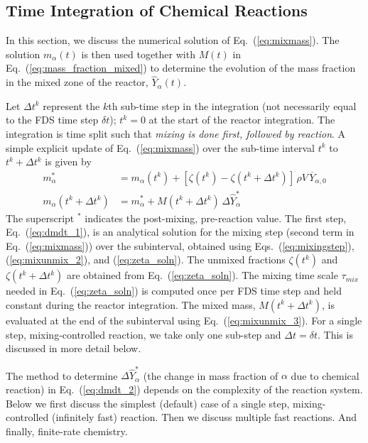 \subsection{Time Integration of Chemical Reactions}
\label{sec:reac_time_integration}

In this section, we discuss the numerical solution of Eq.~(\ref{eq:mixmass}).  The solution $m_\alpha(t)$ is then used together with $M(t)$ in Eq.~(\ref{eq:mass_fraction_mixed}) to determine the evolution of the mass fraction in the mixed zone of the reactor, $\hat{Y}_\alpha(t)$.

Let $\Delta t^k$ represent the $k$th sub-time step in the integration (not necessarily equal to the FDS time step $\delta t$); $t^k=0$ at the start of the reactor integration.  The integration is time split such that \emph{mixing is done first, followed by reaction}. A simple explicit update of Eq.~(\ref{eq:mixmass}) over the sub-time interval $t^k$ to $t^k + \Delta t^k$ is given by
\begin{align}
\label{eq:dmdt_1} m_\alpha^* &= m_{\alpha}(t^k) + [ \zeta(t^k) - \zeta(t^k+\Delta t^k) ] \, \rho V \, \overline{Y}_{\alpha,0}  \\
\label{eq:dmdt_2} m_\alpha(t^k + \Delta t^k) &= m_{\alpha}^* + M(t^k + \Delta t^k) \, \Delta \hat{Y}_\alpha^*
\end{align}
The superscript $^*$ indicates the post-mixing, pre-reaction value.  The first step, Eq.~(\ref{eq:dmdt_1}), is an analytical solution for the mixing step (second term in Eq.~(\ref{eq:mixmass})) over the subinterval, obtained using Eqs.~(\ref{eq:mixingstep}), (\ref{eq:mixunmix_2}), and (\ref{eq:zeta_soln}).  The unmixed fractions $\zeta(t^k)$ and $\zeta(t^k + \Delta t^k)$ are obtained from Eq.~(\ref{eq:zeta_soln}). The mixing time scale $\tau_{mix}$ needed in Eq.~(\ref{eq:zeta_soln}) is computed once per FDS time step and held constant during the reactor integration. The mixed mass, $M(t^k + \Delta t^k)$, is evaluated at the end of the subinterval using Eq.~(\ref{eq:mixunmix_3}). For a single step, mixing-controlled reaction, we take only one sub-step and $\Delta t = \delta t$.  This is discussed in more detail below.  

The method to determine $\Delta \hat{Y}_\alpha^*$ (the change in mass fraction of $\alpha$ due to chemical reaction) in Eq.~(\ref{eq:dmdt_2}) depends on the complexity of the reaction system.  Below we first discuss the simplest (default) case of a single step, mixing-controlled (infinitely fast) reaction.  Then we discuss multiple fast reactions.  And finally, finite-rate chemistry.

